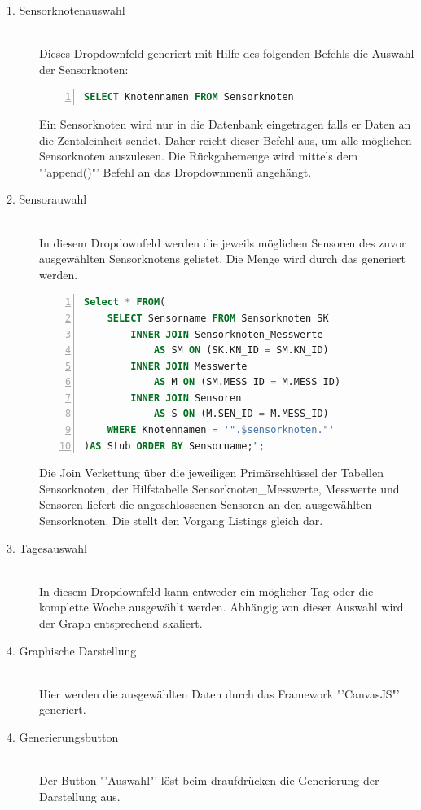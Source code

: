 	\begin{description}
		\item[1. Sensorknotenauswahl] \hfill \\
			Dieses Dropdownfeld generiert mit Hilfe des folgenden Befehls die Auswahl der Sensorknoten:
\begin{lstlisting}[caption=SQL Selektion der Möglichen Sensorknoten,frame=single,numbers=left,language=SQL]
	SELECT Knotennamen FROM Sensorknoten
\end{lstlisting}
			Ein Sensorknoten wird nur in die Datenbank eingetragen falls er Daten an die Zentaleinheit sendet. Daher reicht dieser Befehl aus, um alle möglichen Sensorknoten auszulesen. Die Rückgabemenge wird mittels dem "'append()"' Befehl an das Dropdownmenü angehängt.
		\item[2. Sensorauwahl] \hfill \\
			In diesem Dropdownfeld werden die jeweils möglichen Sensoren des zuvor ausgewählten Sensorknotens gelistet. Die Menge wird durch das  generiert werden.
			\newpage
\begin{lstlisting}[label={Sensorauswahl:Statistik},caption=Auswahl der Sensoren auf der Statistikseite,frame=single,numbers=left,language=SQL]
Select * FROM(
	SELECT Sensorname FROM Sensorknoten SK
		INNER JOIN Sensorknoten_Messwerte 
			AS SM ON (SK.KN_ID = SM.KN_ID)
		INNER JOIN Messwerte 
			AS M ON (SM.MESS_ID = M.MESS_ID)
		INNER JOIN Sensoren 
			AS S ON (M.SEN_ID = M.MESS_ID)
	WHERE Knotennamen = '".$sensorknoten."'
)AS Stub ORDER BY Sensorname;";
\end{lstlisting}
	Die Join Verkettung über die jeweiligen Primärschlüssel der Tabellen Sensorknoten, der Hilfstabelle Sensorknoten\_Messwerte, Messwerte und Sensoren liefert die angeschlossenen Sensoren an den ausgewählten Sensorknoten. Die  stellt den Vorgang Listings gleich dar.

	\item[3. Tagesauswahl] \hfill \\
		In diesem Dropdownfeld kann entweder ein möglicher Tag oder die komplette Woche ausgewählt werden. Abhängig von dieser Auswahl wird der Graph entsprechend skaliert. 
	\item[4. Graphische Darstellung] \hfill \\
		Hier werden die ausgewählten Daten durch das Framework "'CanvasJS"' generiert. 
	\item[4. Generierungsbutton] \hfill \\
		Der Button "'Auswahl"' löst beim draufdrücken die Generierung der Darstellung aus.
	\end{description}
